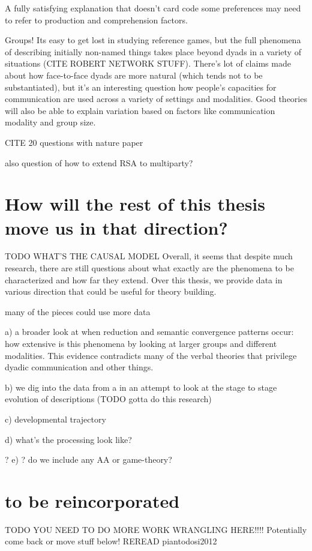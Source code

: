 \documentclass[]{article}
\begin{document}
	A fully satisfying explanation that doesn't card code some preferences may need to refer to production and comprehension factors. 
	
	Groups! Its easy to get lost in studying reference games, but the full phenomena of describing initially non-named things takes place beyond dyads in a variety of situations (CITE ROBERT NETWORK STUFF). There's lot of claims made about how face-to-face dyads are more natural (which tends not to be substantiated), but it's an interesting question how people's capacities for communication are used across a variety of settings and modalities. Good theories will also be able to explain variation based on factors like communication modality and group size. 
	
	CITE 20 questions with nature paper
	
	also question of how to extend RSA to multiparty? 
	
	\section{How will the rest of this thesis move us in that direction?}
	
	TODO WHAT'S THE CAUSAL MODEL
	Overall, it seems that despite much research, there are still questions about what exactly are the phenomena to be characterized and how far they extend. Over this thesis, we provide data in various direction that could be useful for theory building. 
	
	many of the pieces could use more data
	
	a) a broader look at when reduction and semantic convergence patterns occur: how extensive is this phenomena by looking at larger groups and different modalities. This evidence contradicts many of the verbal theories that privilege dyadic communication and other things. 
	
	b) we dig into the data from a in an attempt to look at the stage to stage evolution of descriptions (TODO gotta do this research)
	
	c) developmental trajectory
	
	d) what's the processing look like? 
	
	? e) ? do we include any AA or game-theory? 
	
	\section{to be reincorporated}
	TODO YOU NEED TO DO MORE WORK WRANGLING HERE!!!! Potentially come back or move stuff below!
	REREAD piantodosi2012 
	
\end{document}
